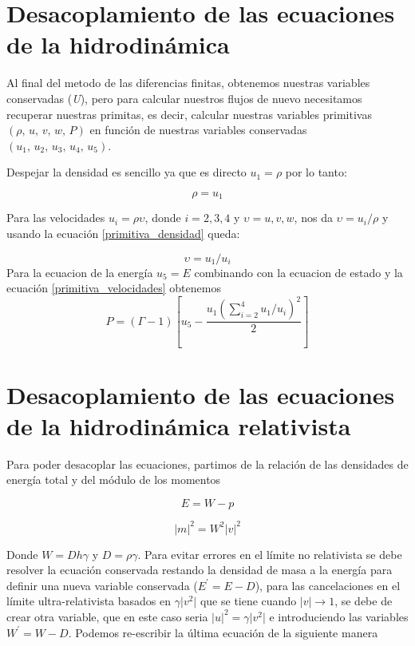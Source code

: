 \documentclass[12pt,a4paper]{book}
\providecommand{\abs}[1]{\lvert#1\rvert} %
\begin{document}
\section{Desacoplamiento de las ecuaciones de la hidrodinámica}

Al final del metodo de las diferencias finitas, obtenemos nuestras variables conservadas (\emph{U}), pero para calcular nuestros flujos de nuevo necesitamos recuperar nuestras primitas, es decir, calcular nuestras variables primitivas $(\rho, \, u, \, v,\, w, \, P )$ en función de nuestras variables conservadas $(u_1, \, u_2, \, u_3, \, u_4, \, u_5)$.

Despejar la densidad es sencillo ya que es directo $u_1= \rho$ por lo tanto:

\begin{equation}\label{primitiva_densidad}
\rho = u_1
\end{equation}

Para las velocidades $u_i=\rho \upsilon$, donde $i=2,3,4$ y $\upsilon=u,v,w$, nos da $\upsilon= u_i/ \rho$ y usando la ecuación \ref{primitiva_densidad} queda:

\begin{equation} \label{primitiva_velocidades}
\upsilon = u_1/u_i
\end{equation}
Para la ecuacion de la energía $u_5=E$ combinando con la ecuacion de estado y la ecuación \ref{primitiva_velocidades} obtenemos
\begin{equation}
P = \left( \Gamma - 1 \right) \left[ u_5 - \frac{u_1 \left( \sum_{i=2}^{4} u_1/u_i \right)^2}{2} \right]
\end{equation}

\section{Desacoplamiento de las ecuaciones de la hidrodinámica relativista}
Para poder desacoplar las ecuaciones, partimos de la relación de las densidades de energía total y del módulo de los momentos

\begin{equation}\label{ecuacion_de_energia}
E=W-p
\end{equation}

\begin{equation}\label{modulos de los momentos}
\abs{m}^2= W^{2}\abs{v}^{2}
\end{equation}

Donde $W=D h \gamma$ y $D=\rho \gamma$. Para evitar errores en el límite no relativista se debe resolver la ecuación conservada restando la densidad de masa a la energía para definir una nueva variable conservada ($E^{'}=E-D$), para las cancelaciones en el límite ultra-relativista basados en $\gamma \abs{v^2}$ que se tiene cuando $\abs{v} \rightarrow 1$, se debe de crear otra variable, que en este caso seria $\abs{u}^2=\gamma \abs{v^2}$ e introduciendo las variables $W^{'}=W-D$. Podemos re-escribir la última ecuación de la siguiente manera
\end{document}
